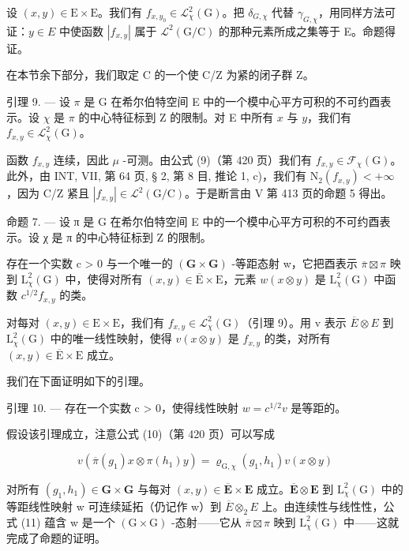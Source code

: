设 \((x,y)\in\mathrm{E}\times\mathrm{E}\)。我们有 \(f_{x,y_{0}}\in\mathcal{L}_{\chi}^{2}(\mathrm{G})\)。把 \(\delta_{G,\chi}\) 代替 \(\gamma_{G,\chi}\)，用同样方法可证：\(y\in E\) 中使函数 \(|f_{x,y}|\) 属于 \(\mathcal{L}^{2}(\mathrm{G}/\mathrm{C})\) 的那种元素所成之集等于 E。命题得证。

在本节余下部分，我们取定 C 的一个使 C/Z 为紧的闭子群 Z。

引理 9. --- 设 \(\pi\) 是 G 在希尔伯特空间 E 中的一个模中心平方可积的不可约酉表示。设 \(\chi\) 是 \(\pi\) 的中心特征标到 Z 的限制。对 E 中所有 \(x\) 与 \(y\)，我们有 \(f_{x,y} \in \mathcal{L}_{\chi}^{2}(\mathrm{G})\)。

 函数 \(f_{x,y}\) 连续，因此 \(\mu\) -可测。由公式 (9)（第 420 页）我们有 \(f_{x,y} \in \mathcal{F}_{\chi}(\mathrm{G})\)。此外，由 INT, VII, 第 64 页, § 2, 第 8 目, 推论 1, c)，我们有 \(\mathrm{N}_{2}(f_{x,y}) < +\infty\)，因为 C/Z 紧且 \(|f_{x,y}| \in \mathcal{L}^{2}(\mathrm{G}/\mathrm{C})\)。于是断言由 V 第 413 页的命题 5 得出。

命题 7. --- 设 π 是 G 在希尔伯特空间 E 中的一个模中心平方可积的不可约酉表示。设 χ 是 π 的中心特征标到 Z 的限制。

存在一个实数 c \textgreater{} 0 与一个唯一的 \((\mathbf{G} \times \mathbf{G})\) -等距态射 w，它把酉表示 \(\overline{\pi} \boxtimes \pi\) 映到 \(\mathrm{L}_{\chi}^{2}(\mathrm{G})\) 中，使得对所有 \((x, y) \in \overline{\mathrm{E}} \times \mathrm{E}\)，元素 \(w(x \otimes y)\) 是 \(\mathrm{L}_{\chi}^{2}(\mathrm{G})\) 中函数 \(c^{1/2} f_{x,y}\) 的类。

 对每对 \((x,y)\in\mathrm{E}\times\mathrm{E}\)，我们有 \(f_{x,y}\in\mathcal{L}_{\chi}^{2}(\mathrm{G})\)（引理 9）。用 v 表示 \(\overline{E}\otimes E\) 到 \(\mathrm{L}_{\chi}^{2}(\mathrm{G})\) 中的唯一线性映射，使得 \(v(x\otimes y)\) 是 \(f_{x,y}\) 的类，对所有 \((x,y)\in\overline{\mathrm{E}}\times\mathrm{E}\) 成立。

我们在下面证明如下的引理。

引理 10. --- 存在一个实数 c \textgreater{} 0，使得线性映射 \(w = c^{1/2}v\) 是等距的。

假设该引理成立，注意公式 (10)（第 420 页）可以写成

\[
v (\overline {{\pi}} (g _ {1}) x \otimes \pi (h _ {1}) y) = \varrho_ {\mathrm{G}, \chi} (g _ {1}, h _ {1}) v (x \otimes y)\tag{11}
\]

 对所有 \((g_{1}, h_{1}) \in \mathbf{G} \times \mathbf{G}\) 与每对 \((x, y) \in \overline{\mathbf{E}} \times \mathbf{E}\) 成立。\(\overline{\mathbf{E}} \otimes \mathbf{E}\) 到 \(\mathrm{L}_{\chi}^{2}(\mathrm{G})\) 中的等距线性映射 w 可连续延拓（仍记作 w）到 \(\overline{E} \widehat{\otimes}_{2} E\) 上。由连续性与线性性，公式 (11) 蕴含 w 是一个 \((\mathrm{G} \times \mathrm{G})\) -态射——它从 \(\overline{\pi} \boxtimes \pi\) 映到 \(\mathrm{L}_{\chi}^{2}(\mathrm{G})\) 中——这就完成了命题的证明。


